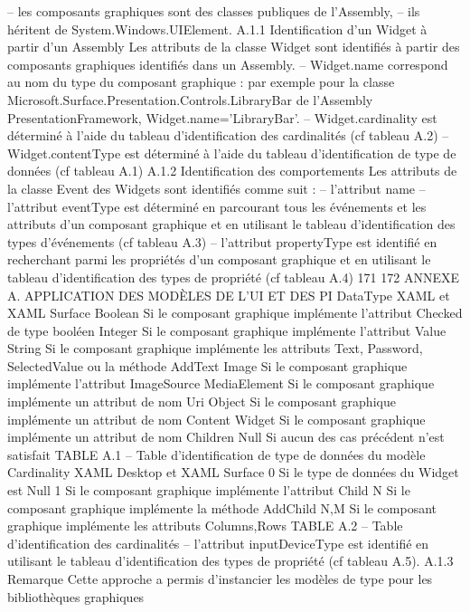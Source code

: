 \documentclass{article}
\begin{document}
– les composants graphiques sont des classes publiques de l’Assembly,
– ils h\'{e}ritent de System.Windows.UIElement.
A.1.1
Identiﬁcation d’un Widget \`{a} partir d’un Assembly
Les attributs de la classe Widget sont identiﬁ\'{e}s \`{a} partir des composants graphiques identiﬁ\'{e}s dans
un Assembly.
– Widget.name correspond au nom du type du composant graphique : par exemple pour la
classe Microsoft.Surface.Presentation.Controls.LibraryBar de l’Assembly PresentationFramework, Widget.name=’LibraryBar’.
– Widget.cardinality est d\'{e}termin\'{e} \`{a} l’aide du tableau d’identiﬁcation des cardinalit\'{e}s (cf tableau A.2)
– Widget.contentType est d\'{e}termin\'{e} \`{a} l’aide du tableau d’identiﬁcation de type de donn\'{e}es (cf
tableau A.1)
A.1.2
Identiﬁcation des comportements
Les attributs de la classe Event des Widgets sont identiﬁ\'{e}s comme suit :
– l’attribut name
– l’attribut eventType est d\'{e}termin\'{e} en parcourant tous les \'{e}v\'{e}nements et les attributs d’un composant graphique et en utilisant le tableau d’identiﬁcation des types d’\'{e}v\'{e}nements (cf tableau A.3)
– l’attribut propertyType est identiﬁ\'{e} en recherchant parmi les propri\'{e}t\'{e}s d’un composant graphique et en utilisant le tableau d’identiﬁcation des types de propri\'{e}t\'{e} (cf tableau A.4)
171
172
ANNEXE A. APPLICATION DES MODÈLES DE L’UI ET DES PI
DataType
XAML et XAML Surface
Boolean
Si le composant graphique impl\'{e}mente l’attribut Checked de type bool\'{e}en
Integer
Si le composant graphique impl\'{e}mente l’attribut Value
String
Si le composant graphique impl\'{e}mente les attributs Text, Password, SelectedValue
ou la m\'{e}thode AddText
Image
Si le composant graphique impl\'{e}mente l’attribut ImageSource
MediaElement
Si le composant graphique impl\'{e}mente un attribut de nom Uri
Object
Si le composant graphique impl\'{e}mente un attribut de nom Content
Widget
Si le composant graphique impl\'{e}mente un attribut de nom Children
Null
Si aucun des cas pr\'{e}c\'{e}dent n’est satisfait
TABLE A.1 – Table d’identiﬁcation de type de donn\'{e}es du mod\`{e}le
Cardinality
XAML Desktop et XAML Surface
0
Si le type de donn\'{e}es du Widget est Null
1
Si le composant graphique impl\'{e}mente l’attribut Child
N
Si le composant graphique impl\'{e}mente la m\'{e}thode AddChild
N,M
Si le composant graphique impl\'{e}mente les attributs Columns,Rows
TABLE A.2 – Table d’identiﬁcation des cardinalit\'{e}s
– l’attribut inputDeviceType est identiﬁ\'{e} en utilisant le tableau d’identiﬁcation des types de propri\'{e}t\'{e} (cf tableau A.5).
A.1.3
Remarque
Cette approche a permis d’instancier les mod\`{e}les de type pour les biblioth\`{e}ques graphiques
\end{document}
